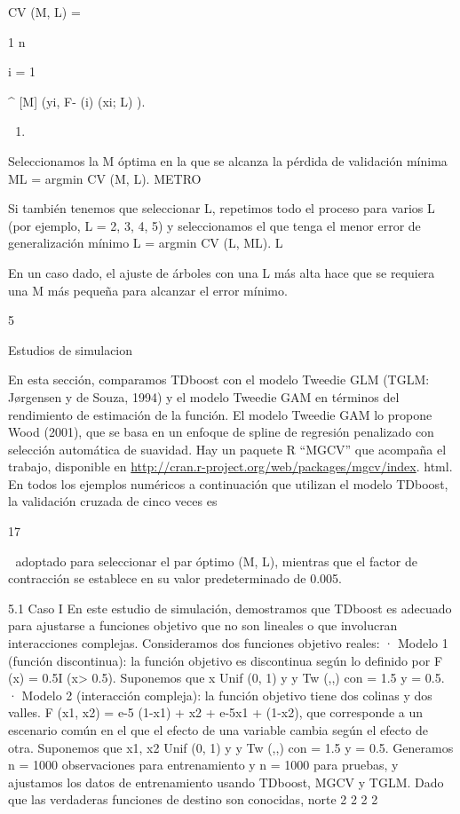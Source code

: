 \documentclass[]{article}
\begin{document}
CV (M, L) =

1 n

i = 1

\^{} {[}M{]} (yi, F- (i) (xi; L) \textbar{}).

\begin{enumerate}
\def\labelenumi{(\arabic{enumi})}
\setcounter{enumi}{25}
\item
\end{enumerate}

Seleccionamos la M óptima en la que se alcanza la pérdida de validación
mínima ML = argmin CV (M, L). METRO

Si también tenemos que seleccionar L, repetimos todo el proceso para
varios L (por ejemplo, L = 2, 3, 4, 5) y seleccionamos el que tenga el
menor error de generalización mínimo L = argmin CV (L, ML). L

En un caso dado, el ajuste de árboles con una L más alta hace que se
requiera una M más pequeña para alcanzar el error mínimo.

5

Estudios de simulacion

En esta sección, comparamos TDboost con el modelo Tweedie GLM (TGLM:
Jørgensen y de Souza, 1994) y el modelo Tweedie GAM en términos del
rendimiento de estimación de la función. El modelo Tweedie GAM lo
propone Wood (2001), que se basa en un enfoque de spline de regresión
penalizado con selección automática de suavidad. Hay un paquete R
``MGCV'' que acompaña el trabajo, disponible en
\url{http://cran.r-project.org/web/packages/mgcv/index}. html. En todos
los ejemplos numéricos a continuación que utilizan el modelo TDboost, la
validación cruzada de cinco veces es

17

 adoptado para seleccionar el par óptimo (M, L), mientras que el factor
de contracción se establece en su valor predeterminado de 0.005.

5.1 Caso I En este estudio de simulación, demostramos que TDboost es
adecuado para ajustarse a funciones objetivo que no son lineales o que
involucran interacciones complejas. Consideramos dos funciones objetivo
reales: · Modelo 1 (función discontinua): la función objetivo es
discontinua según lo definido por F (x) = 0.5I (x\textgreater{} 0.5).
Suponemos que x Unif (0, 1) y y Tw (,,) con = 1.5 y = 0.5. · Modelo 2
(interacción compleja): la función objetivo tiene dos colinas y dos
valles. F (x1, x2) = e-5 (1-x1) + x2 + e-5x1 + (1-x2), que corresponde a
un escenario común en el que el efecto de una variable cambia según el
efecto de otra. Suponemos que x1, x2 Unif (0, 1) y y Tw (,,) con = 1.5 y
= 0.5. Generamos n = 1000 observaciones para entrenamiento y n = 1000
para pruebas, y ajustamos los datos de entrenamiento usando TDboost,
MGCV y TGLM. Dado que las verdaderas funciones de destino son conocidas,
norte 2 2 2 2
\end{document}
